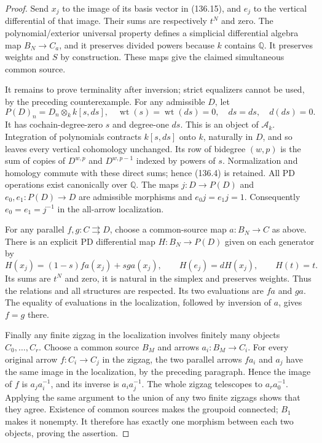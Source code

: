 \documentclass[11pt,a4paper]{article}
\theoremstyle{definition}\newtheorem{definition}[theorem]{Definition}
\theoremstyle{remark}\newtheorem{remark}[theorem]{Remark}
\begin{document}
\begin{proof}
Send $x_j$ to the image of its basis vector in
(136.15), and $e_j$ to the vertical differential
of that image.  Their sums are respectively
$t^N$ and zero.  The polynomial/exterior universal
property defines a simplicial differential algebra
map $B_N\to C_a$, and it preserves divided powers
because $k$ contains $\mathbb Q$.  It preserves
weights and $S$ by construction.  These maps give
the claimed simultaneous common source.

It remains to prove terminality after inversion;
strict equalizers cannot be used, by the preceding
counterexample.  For any admissible $D$, let
\[
 P(D)_n=D_n\otimes_k k[s,ds],\quad
 \operatorname{wt}(s)=\operatorname{wt}(ds)=0,
 \quad d s=ds,\quad d(ds)=0.                              \tag{136.16}
\]
It has cochain-degree-zero $s$ and degree-one $ds$.
This is an object of $\mathcal A_k$.  Integration of
polynomials contracts $k[s,ds]$ onto $k$, naturally
in $D$, and so leaves every vertical cohomology
unchanged.  Its row of bidegree $(w,p)$ is the sum
of copies of $D^{w,p}$ and $D^{w,p-1}$ indexed by
powers of $s$.  Normalization and homology commute
with these direct sums; hence (136.4) is retained.
All PD operations exist canonically over $\mathbb Q$.
The maps $j:D\to P(D)$ and
$e_0,e_1:P(D)\to D$ are admissible morphisms and
$e_0j=e_1j=1$.  Consequently $e_0=e_1=j^{-1}$ in
the all-arrow localization.

For any parallel $f,g:C\rightrightarrows D$, choose
a common-source map $a:B_N\to C$ as above.
There is an explicit PD differential map
$H:B_N\to P(D)$ given on each generator by
\[
 H(x_j)=(1-s)fa(x_j)+sga(x_j),\qquad H(e_j)=dH(x_j),
 \qquad H(t)=t.                                           \tag{136.17}
\]
Its sums are $t^N$ and zero, it is natural in the
simplex and preserves weights.  Thus the relations
and all structures are respected.  Its two
evaluations are $fa$ and $ga$.  The equality of
evaluations in the localization, followed by
inversion of $a$, gives $f=g$ there.

Finally any finite zigzag in the localization
involves finitely many objects $C_0,\ldots,C_r$.
Choose a common source $B_M$ and arrows
$a_i:B_M\to C_i$.  For every original arrow
$f:C_i\to C_j$ in the zigzag, the two parallel
arrows $fa_i$ and $a_j$ have the same image in
the localization, by the preceding paragraph.
Hence the image of $f$ is $a_j a_i^{-1}$, and
its inverse is $a_i a_j^{-1}$.  The whole zigzag
telescopes to $a_r a_0^{-1}$.  Applying the same
argument to the union of any two finite zigzags
shows that they agree.  Existence of common sources
makes the groupoid connected; $B_1$ makes it
nonempty.  It therefore has exactly one morphism
between each two objects, proving the assertion.
\end{proof}
\end{document}

